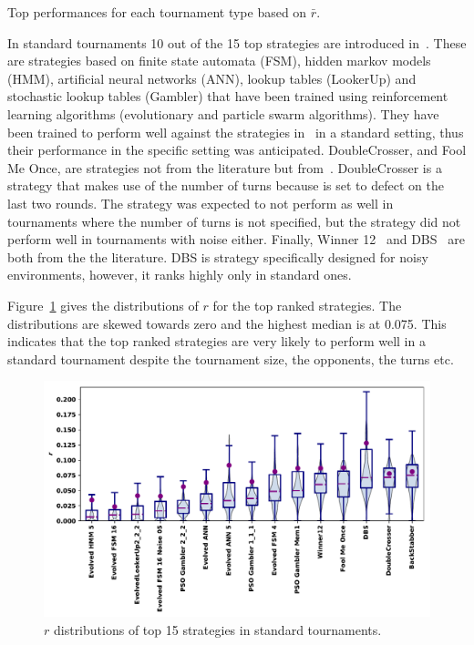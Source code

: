 \documentclass{article}
\begin{document}
\begin{table}[!htbp]
    \begin{center}
    \resizebox{.9\textwidth}{!}{
        
    }
\end{center}
\caption{Top performances for each tournament type based on $\bar{r}$.}
\label{table:top_performances}
\end{table}

In standard tournaments 10 out of the 15 top strategies are introduced
in~\cite{Harper2017}. These are strategies based on finite state automata (FSM),
hidden markov models (HMM), artificial neural networks (ANN), lookup tables
(LookerUp) and stochastic lookup tables (Gambler) that have been trained using
reinforcement learning algorithms (evolutionary and particle swarm algorithms).
They have been trained to perform well against the strategies
in~\cite{axelrodproject} in a standard setting, thus their performance in the
specific setting was anticipated. DoubleCrosser, and Fool Me Once, are
strategies not from the literature but from~\cite{axelrodproject}. DoubleCrosser
is a strategy that makes use of the number of turns because is set to defect on
the last two rounds. The strategy was expected to not perform as well in
tournaments where the number of turns is not specified, but the strategy did not
perform well in tournaments with noise either. Finally, Winner
12~\cite{mathieu2017} and DBS~\cite{Au2006} are both from the the literature.
DBS is strategy specifically designed for noisy environments, however, it ranks
highly only in standard ones.

Figure~\ref{fig:std_results} gives the distributions of $r$ for the top
ranked strategies. The distributions are skewed towards zero and the highest
median is at 0.075. This indicates that the top ranked strategies are very
likely to perform well in a standard tournament despite the tournament size,
the opponents, the turns etc.

\begin{figure}[!htbp]
    \centering
    \includegraphics[width=.55\textwidth]{../images/performance_standard.pdf}
    \caption{$r$ distributions of top 15 strategies in standard tournaments.}\label{fig:std_results}
\end{figure}
\end{document}
